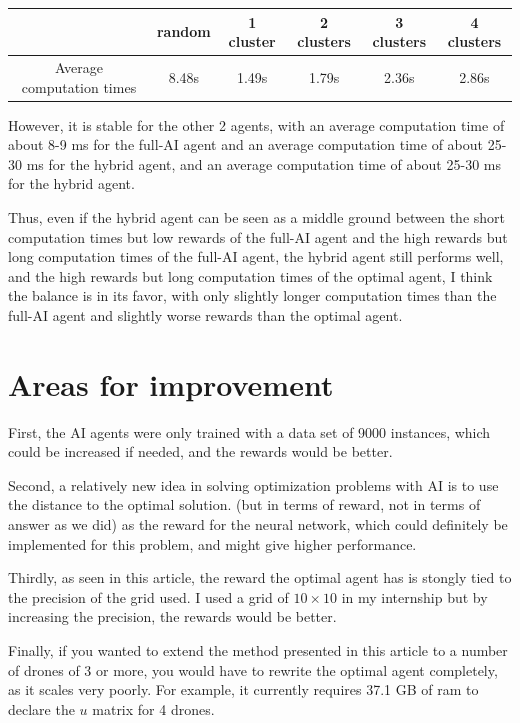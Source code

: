 \documentclass[letterpaper]{article}
\begin{document}
\begin{center}
    \begin{tabular}{|c|c|c|c|c|c|}
    \hline 
       & random & 1 cluster & 2 clusters & 3 clusters & 4 clusters \\ 
     \hline
     Average computation times & 8.48s & 1.49s & 1.79s & 2.36s & 2.86s \\  
     \hline
    \end{tabular}
\end{center}

However, it is stable for the other 2 agents, with an average computation time of about 8-9 ms for the full-AI agent and an average computation time of about 25-30 ms for the hybrid agent,
and an average computation time of about 25-30 ms for the hybrid agent.

Thus, even if the hybrid agent can be seen as a middle ground between the short computation times but low rewards of the full-AI agent and the high rewards but long computation times of the full-AI agent, the hybrid agent still performs well,
and the high rewards but long computation times of the optimal agent, I think the balance is in its favor,
with only slightly longer computation times than the full-AI agent and slightly worse rewards than the optimal agent.


\section{Areas for improvement}

First, the AI agents were only trained with a data set of 9000 instances, which could be increased if needed,
and the rewards would be better.

Second, a relatively new idea in solving optimization problems with AI is to use the distance to the optimal solution.
(but in terms of reward, not in terms of answer as we did) as the reward for the neural network, which could definitely be implemented for this problem,
and might give higher performance.

Thirdly, as seen in this article\cite{main_article}, the reward the optimal agent has is stongly tied to the precision of the grid used.
I used a grid of $10 \times 10$ in my internship but by increasing the precision, the rewards would be better.

Finally, if you wanted to extend the method presented in this article to a number of drones of 3 or more, you would have to
rewrite the optimal agent completely, as it scales very poorly.
For example, it currently requires 37.1 GB of ram to declare the $u$ matrix for 4 drones.
\end{document}
